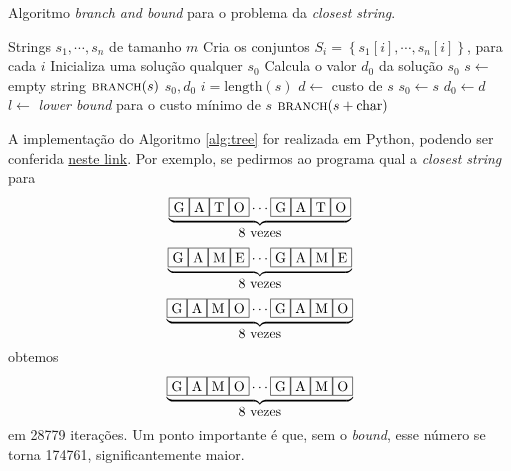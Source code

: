 \begin{algorithm}[H]
    \caption{Algoritmo \textit{branch and bound} para o problema da \textit{closest string}.}
    \label{alg:tree}
    \begin{algorithmic}
        \Require Strings $s_1, \cdots, s_n$ de tamanho $m$
        \State Cria os conjuntos $S_i = \left\{s_1[i], \cdots, s_n[i]\right\}$, para cada $i$
        \State Inicializa uma solução qualquer $s_0$
        \State Calcula o valor $d_0$ da solução $s_0$
        \State $s \gets$ empty string
        \State $\textsc{branch}(s)$        
        \State \Return $s_0, d_0$
        \State
            \State $i = \text{length}(s)$
                \State $d \gets$ custo de $s$
                    \State $s_0 \gets s$
                    \State $d_0 \gets d$
                \EndIf
                \State \Return
            \EndIf
            \State $l \gets$ \textit{lower bound} para o custo mínimo de $s$ 
                \State \Return
            \EndIf
                \State $\textsc{branch}(s + \text{char})$ 
            \EndFor
        \EndProcedure
    \end{algorithmic}
\end{algorithm}

A implementação do Algoritmo \ref{alg:tree} for realizada em Python, podendo ser conferida \href{https://github.com/lucasresck/data-structures-algorithms/blob/main/intractable_problems/scripts/closest_string_tree.py}{neste link}. Por exemplo, se pedirmos ao programa qual a \textit{closest string} para 
\[\overset{\underbrace{\text{\fbox{G}\fbox{A}\fbox{T}\fbox{O}}\cdots\text{\fbox{G}\fbox{A}\fbox{T}\fbox{O}}}}{\text{8 vezes}}\]
\[\overset{\underbrace{\text{\fbox{G}\fbox{A}\fbox{M}\fbox{E}}\cdots\text{\fbox{G}\fbox{A}\fbox{M}\fbox{E}}}}{\text{8 vezes}}\]
\[\overset{\underbrace{\text{\fbox{G}\fbox{A}\fbox{M}\fbox{O}}\cdots\text{\fbox{G}\fbox{A}\fbox{M}\fbox{O}}}}{\text{8 vezes}}\]
obtemos 
\[\overset{\underbrace{\text{\fbox{G}\fbox{A}\fbox{M}\fbox{O}}\cdots\text{\fbox{G}\fbox{A}\fbox{M}\fbox{O}}}}{\text{8 vezes}}\] em 28779 iterações. Um ponto importante é que, sem o \textit{bound}, esse número se torna 174761, significantemente maior.
